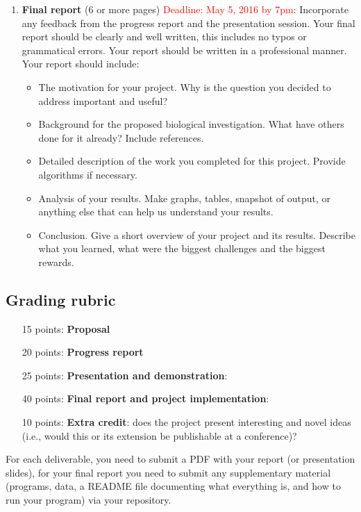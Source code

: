 \begin{enumerate}
\item \textbf{Final report} (6 or more pages) \textcolor{red}{Deadline: May 5, 2016 by 7pm}: Incorporate any feedback from the progress report and the presentation session. Your final report should be clearly and well written, this includes no typos or grammatical errors. Your report should be written in a professional  manner.  Your report should include:
\begin{itemize}
	\item The motivation for your project. Why is the question you decided to address important and useful?
	\item Background for the proposed biological investigation. What have others done for it already? Include references.
	\item Detailed  description of the work you completed for this project. Provide algorithms if necessary.
	\item Analysis of your results. Make graphs, tables, snapshot of output, or anything else that can help us understand your results.
	\item Conclusion. Give a short overview of your project and its results. Describe what you learned, what were the biggest challenges and the biggest rewards. 
	\end{itemize}
	

\end{enumerate}

\subsection*{ Grading rubric}
\begin{enumerate}  	
  	\item[15 points:] \textbf{Proposal}
  	\item[20 points:] \textbf{Progress report}
 	\item[25 points:]  \textbf{Presentation and demonstration}:
 	\item[40 points:] \textbf{Final report and project implementation}:  
  	\item[10 points:]  \textbf{Extra credit}: does the project present interesting and novel ideas (i.e., would this or its extension be publishable at a conference)? 
\end{enumerate}

\noindent For each deliverable, you need to submit a PDF with your report (or presentation slides), for your final report you need to submit any supplementary material (programs, data, a README file documenting what everything is, and how to run your program) via your repository. 

